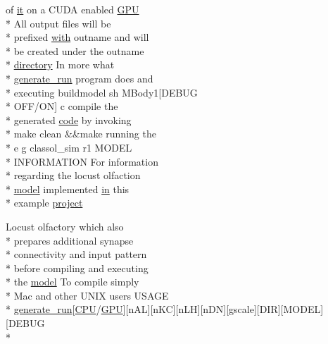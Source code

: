 \begin{DoxyCompactItemize}
of \hyperlink{userproject_2PoissonIzh__project_2README_8txt_a3e3bbb6c9b14c38757cf273a117e43e8}{it} on a C\+U\+D\+A enabled \hyperlink{modelSpec_8h_a39cb9803524b6f3b783344b2f89867b4}{G\+P\+U} \\*
All output files will be \\*
prefixed \hyperlink{userproject_2OneComp__project_2README_8txt_ace09bb40fbf4457ad9a9340a67a4fa9a}{with} outname and will \\*
be created under the outname \\*
\hyperlink{README_8txt_ae619b68020535fba5ac79522a0d9d1c4}{directory} In more what \\*
\hyperlink{userproject_2MBody__userdef__project_2README_8txt_a320a215d1e27b4de394be70e90d22863}{generate\+\_\+run} program does and \\*
executing buildmodel sh M\+Body1\mbox{[}D\+E\+B\+U\+G \\*
O\+F\+F/O\+N\mbox{]} c compile the \\*
generated \hyperlink{userproject_2MBody__userdef__project_2README_8txt_aeec4e596748e7c29dd5548dae4c70685}{code} by invoking \\*
make clean \&\&make running the \\*
e g classol\+\_\+sim r1 M\+O\+D\+E\+L \\*
I\+N\+F\+O\+R\+M\+A\+T\+I\+O\+N For information \\*
regarding the locust olfaction \\*
\hyperlink{README_8txt_a69fd801b7213948c12d9dd7eebb3ed14}{model} implemented \hyperlink{README_8txt_a148897a6b2cc9cff25af80abb13426b0}{in} this \\*
example \hyperlink{userproject_2MBody1__project_2README_8txt_a6be7686af1c095c33166a32d892865dc}{project}
\item 
Locust olfactory which also \\*
prepares additional synapse \\*
connectivity and input pattern \\*
before compiling and executing \\*
the \hyperlink{README_8txt_a69fd801b7213948c12d9dd7eebb3ed14}{model} To compile simply \\*
Mac and other U\+N\+I\+X users U\+S\+A\+G\+E \\*
\hyperlink{userproject_2MBody__userdef__project_2README_8txt_a320a215d1e27b4de394be70e90d22863}{generate\+\_\+run}\mbox{[}\hyperlink{README_8txt_a74a069e3c75797de2636c4dd14daa147}{C\+P\+U}/\hyperlink{modelSpec_8h_a39cb9803524b6f3b783344b2f89867b4}{G\+P\+U}\mbox{]}\mbox{[}n\+A\+L\mbox{]}\mbox{[}n\+K\+C\mbox{]}\mbox{[}n\+L\+H\mbox{]}\mbox{[}n\+D\+N\mbox{]}\mbox{[}gscale\mbox{]}\mbox{[}D\+I\+R\mbox{]}\mbox{[}M\+O\+D\+E\+L\mbox{]}\mbox{[}D\+E\+B\+U\+G \\*

\end{DoxyCompactItemize}

